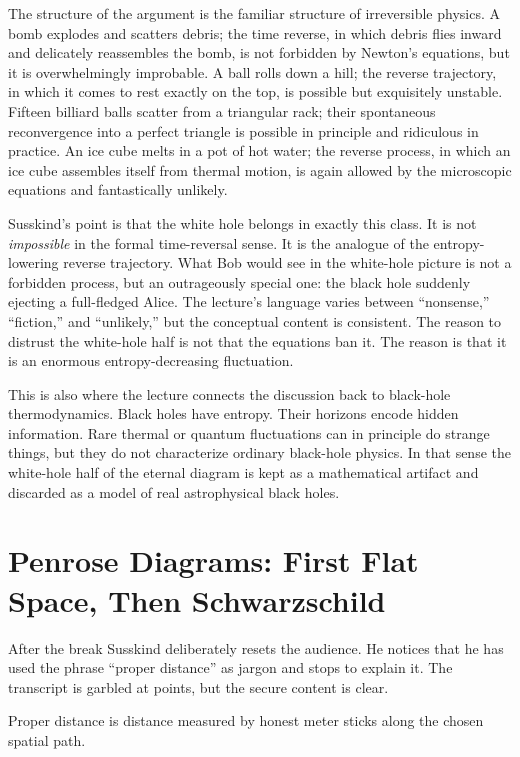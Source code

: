 The structure of the argument is the familiar structure of irreversible physics. A bomb explodes and scatters debris; the time reverse, in which debris flies inward and delicately reassembles the bomb, is not forbidden by Newton's equations, but it is overwhelmingly improbable. A ball rolls down a hill; the reverse trajectory, in which it comes to rest exactly on the top, is possible but exquisitely unstable. Fifteen billiard balls scatter from a triangular rack; their spontaneous reconvergence into a perfect triangle is possible in principle and ridiculous in practice. An ice cube melts in a pot of hot water; the reverse process, in which an ice cube assembles itself from thermal motion, is again allowed by the microscopic equations and fantastically unlikely.

Susskind's point is that the white hole belongs in exactly this class. It is not \emph{impossible} in the formal time-reversal sense. It is the analogue of the entropy-lowering reverse trajectory. What Bob would see in the white-hole picture is not a forbidden process, but an outrageously special one: the black hole suddenly ejecting a full-fledged Alice. The lecture's language varies between ``nonsense,'' ``fiction,'' and ``unlikely,'' but the conceptual content is consistent. The reason to distrust the white-hole half is not that the equations ban it. The reason is that it is an enormous entropy-decreasing fluctuation.

This is also where the lecture connects the discussion back to black-hole thermodynamics. Black holes have entropy. Their horizons encode hidden information. Rare thermal or quantum fluctuations can in principle do strange things, but they do not characterize ordinary black-hole physics. In that sense the white-hole half of the eternal diagram is kept as a mathematical artifact and discarded as a model of real astrophysical black holes.

\section{Penrose Diagrams: First Flat Space, Then Schwarzschild}

After the break Susskind deliberately resets the audience. He notices that he has used the phrase ``proper distance'' as jargon and stops to explain it. The transcript is garbled at points, but the secure content is clear.

\begin{definition}
Proper distance is distance measured by honest meter sticks along the chosen spatial path.
\end{definition}


